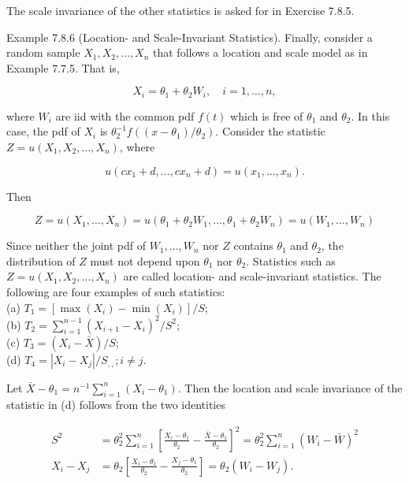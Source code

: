 The scale invariance of the other statistics is asked for in Exercise 7.8.5.

Example 7.8.6 (Location- and Scale-Invariant Statistics). Finally, consider a random sample $X_{1}, X_{2}, \ldots, X_{n}$ that follows a location and scale model as in Example 7.7.5. That is,


\begin{equation*}
X_{i}=\theta_{1}+\theta_{2} W_{i}, \quad i=1, \ldots, n, \tag{7.8.5}
\end{equation*}


where $W_{i}$ are iid with the common pdf $f(t)$ which is free of $\theta_{1}$ and $\theta_{2}$. In this case, the pdf of $X_{i}$ is $\theta_{2}^{-1} f\left(\left(x-\theta_{1}\right) / \theta_{2}\right)$. Consider the statistic $Z=u\left(X_{1}, X_{2}, \ldots, X_{n}\right)$, where

$$
u\left(c x_{1}+d, \ldots, c x_{n}+d\right)=u\left(x_{1}, \ldots, x_{n}\right) .
$$

Then

$$
Z=u\left(X_{1}, \ldots, X_{n}\right)=u\left(\theta_{1}+\theta_{2} W_{1}, \ldots, \theta_{1}+\theta_{2} W_{n}\right)=u\left(W_{1}, \ldots, W_{n}\right)
$$

Since neither the joint pdf of $W_{1}, \ldots, W_{n}$ nor $Z$ contains $\theta_{1}$ and $\theta_{2}$, the distribution of $Z$ must not depend upon $\theta_{1}$ nor $\theta_{2}$. Statistics such as $Z=u\left(X_{1}, X_{2}, \ldots, X_{n}\right)$ are called location- and scale-invariant statistics. The following are four examples of such statistics:\\
(a) $T_{1}=\left[\max \left(X_{i}\right)-\min \left(X_{i}\right)\right] / S$;\\
(b) $T_{2}=\sum_{i=1}^{n-1}\left(X_{i+1}-X_{i}\right)^{2} / S^{2}$;\\
(c) $T_{3}=\left(X_{i}-\bar{X}\right) / S$;\\
(d) $T_{4}=\left|X_{i}-X_{j}\right| / S_{,,} ; i \neq j$.

Let $\bar{X}-\theta_{1}=n^{-1} \sum_{i=1}^{n}\left(X_{i}-\theta_{1}\right)$. Then the location and scale invariance of the statistic in (d) follows from the two identities

$$
\begin{aligned}
S^{2} & =\theta_{2}^{2} \sum_{i=1}^{n}\left[\frac{X_{i}-\theta_{1}}{\theta_{2}}-\frac{\bar{X}-\theta_{1}}{\theta_{2}}\right]^{2}=\theta_{2}^{2} \sum_{i=1}^{n}\left(W_{i}-\bar{W}\right)^{2} \\
X_{i}-X_{j} & =\theta_{2}\left[\frac{X_{i}-\theta_{1}}{\theta_{2}}-\frac{X_{j}-\theta_{1}}{\theta_{2}}\right]=\theta_{2}\left(W_{i}-W_{j}\right) .
\end{aligned}
$$

